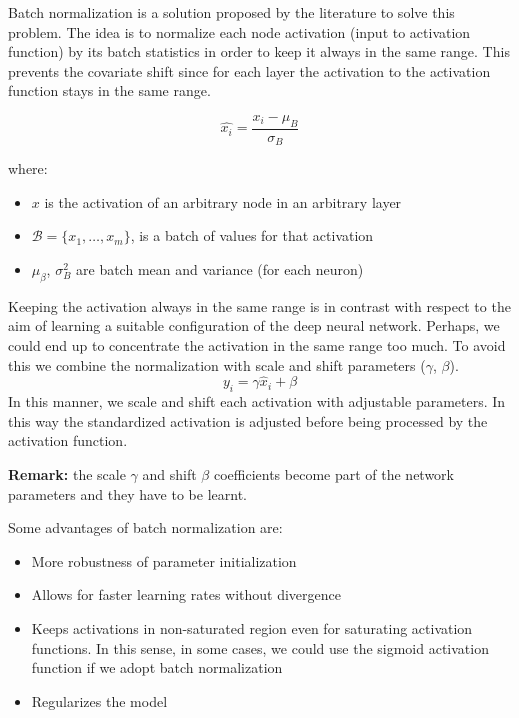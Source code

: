 Batch normalization is a solution proposed by the literature to solve this
problem. The idea is to normalize each node activation (input to activation
function) by its batch statistics in order to keep it always in the same range.
This prevents the covariate shift since for each layer the activation to the
activation function stays in the same range.

\[
	\hat{x_i}= \frac{x_{i}- \mu_{B}}{\sigma_{B}}
\]

where:
\begin{itemize}
	\item $x$ is the activation of an arbitrary node in an arbitrary layer

	\item $\mathcal{B}= \{x_{1}, \hdots, x_{m}\}$, is a batch of values for that
		activation

	\item $\mu_{\beta}$, $\sigma_{B}^{2}$ are batch mean and variance (for each neuron)
\end{itemize}

Keeping the activation always in the same range is in contrast with respect to the
aim of learning a suitable configuration of the deep neural network. Perhaps, we
could end up to concentrate the activation in the same range too much. To avoid
this we combine the normalization with scale and shift parameters ($\gamma$,
$\beta$).
\[
	y_{i}= \gamma \hat{x}_{i}+ \beta
\]
In this manner, we scale and shift each activation with adjustable parameters.
In this way the standardized activation is adjusted before being processed by
the activation function.
\newline

\textbf{Remark:} the scale $\gamma$ and shift $\beta$ coefficients become part of
the network parameters and they have to be learnt.
\newline

Some advantages of batch normalization are:
\begin{itemize}
	\item More robustness of parameter initialization

	\item Allows for faster learning rates without divergence

	\item Keeps activations in non-saturated region even for saturating activation
		functions. In this sense, in some cases, we could use the sigmoid activation
		function if we adopt batch normalization

	\item Regularizes the model
\end{itemize}


